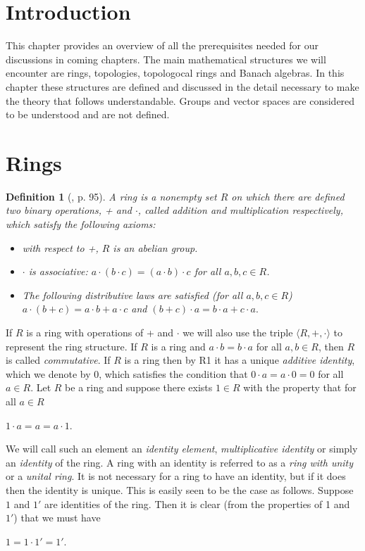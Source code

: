\documentclass[12pt, oneside]{book}
\newtheorem{definition}[theorem]{Definition}
\begin{document}
\section{Introduction}

This chapter provides an overview of all the prerequisites needed for our discussions in coming chapters. 
The main mathematical structures we will encounter are rings, topologies, topologocal rings and 
Banach algebras. In this chapter these structures are defined and discussed in the detail necessary to make the theory that follows understandable. Groups and vector spaces are considered to be understood and are not defined. 

\section{Rings}

\begin{definition}[\cite{G1}, p. 95] \label{RingDefinition}
\normalfont
\noindent A {\sl ring} is a nonempty set $R$ on which there are defined two binary operations, + and $\cdot$, called addition and multiplication respectively, which satisfy the following axioms:
\begin{itemize}
\item [R1.] \quad with respect to +, $R$ is an abelian group.
\item [R2.] \quad  $\cdot$ is associative: 
$a \cdot (b \cdot c) = (a \cdot b) \cdot c$ for all $a, b, c \in R$. 	
\item [R3.] \quad The following distributive laws are satisfied (for all $a, b, c \in R$)
\vskip 0.3cm
$a \cdot (b + c) = a \cdot b + a \cdot c $ \qquad  and \qquad $(b + c)\cdot a = b \cdot a + c \cdot a.$
\end{itemize}
\end{definition} 
\noindent If $R$ is a ring with operations of + and $\cdot$ we will also use the triple 
$\langle R, +, \cdot \rangle$ to represent the ring structure.
\vskip 0.3cm
\noindent If $R$ is a ring and $a \cdot b = b \cdot a$ for all $a, b \in R$, then $R$ is called 
{\sl commutative}.
\vskip 0.3cm
\noindent If $R$ is a ring then by R1 it has a unique {\sl additive identity}, 
which we denote by $0$, which satisfies the condition that $0 \cdot a = a \cdot 0 = 0$ for all 
$a \in R$.
\vskip 0.3cm
\noindent Let $R$ be a ring and suppose there exists $1 \in R$ 
with the property that for all $a \in R$
\begin{center}
$1 \cdot a = a = a \cdot 1$.
\end{center}
\noindent We will call such an element an {\sl identity element}, {\sl multiplicative identity} or 
simply an {\sl identity} of the ring. 
A ring with an identity is referred to as a {\sl ring with unity} or a {\sl unital ring}. 
It is not necessary for a ring to have an identity, but if it does then the identity is unique. 
This is easily seen to be the case as follows. Suppose $1$ and $1'$ are identities of the ring. 
Then it is clear (from the properties of 1 and $1'$) that we must have 
\begin{center}
$1 = 1 \cdot 1' = 1'$.
\end{center}
\vskip 0.3cm
\end{document}
